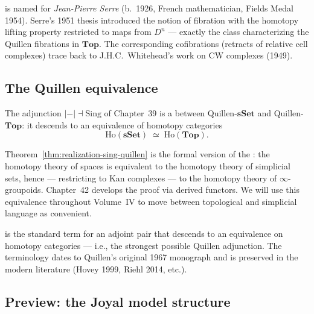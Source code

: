 \begin{nameorigin}
 is named for \emph{Jean-Pierre Serre} (b.~1926,
French mathematician, Fields Medal 1954). Serre's 1951 thesis
introduced the notion of fibration with the homotopy lifting property
restricted to maps from $D^n$ — exactly the class characterizing the
Quillen fibrations in $\mathbf{Top}$. The corresponding cofibrations
(retracts of relative cell complexes) trace back to J.H.C.\ Whitehead's
work on CW complexes (1949).
\end{nameorigin}

\subsection{The Quillen equivalence}

\begin{theorem}
\label{thm:realization-sing-quillen}
The adjunction $\lvert{-}\rvert \dashv \mathrm{Sing}$ of Chapter~39 is a
 between Quillen-$\mathbf{sSet}$ and
Quillen-$\mathbf{Top}$: it descends to an equivalence of homotopy
categories
\begin{equation*}
  \mathrm{Ho}(\mathbf{sSet}) \;\simeq\; \mathrm{Ho}(\mathbf{Top}).
\end{equation*}
\end{theorem}

\begin{remark}
Theorem~\ref{thm:realization-sing-quillen} is the formal version of the
: the homotopy theory of spaces is equivalent
to the homotopy theory of simplicial sets, hence — restricting to
Kan complexes — to the homotopy theory of $\infty$-groupoids.
Chapter~42 develops the proof via derived functors. We will use this
equivalence throughout Volume~IV to move between topological and
simplicial language as convenient.
\end{remark}

\begin{nameorigin}
 is the standard term for an adjoint pair
that descends to an equivalence on homotopy categories — i.e., the
strongest possible Quillen adjunction. The terminology dates to
Quillen's original 1967 monograph and is preserved in the modern
literature (Hovey 1999, Riehl 2014, etc.).
\end{nameorigin}

\subsection{Preview: the Joyal model structure}

